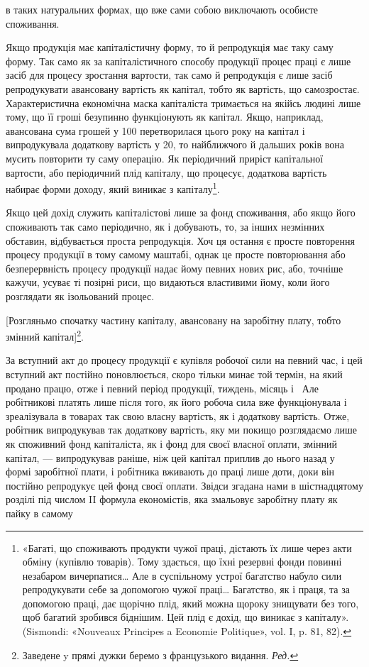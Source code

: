 \parcont{}  %
в таких натуральних формах, що вже сами собою виключають
особисте споживання.

Якщо продукція має капіталістичну форму, то й репродукція
має таку саму форму. Так само як за капіталістичного способу
продукції процес праці є лише засіб для процесу зростання
вартости, так само й репродукція є лише засіб репродукувати
авансовану вартість як капітал, тобто як вартість, що самозростає.
Характеристична економічна маска капіталіста тримається
на якійсь людині лише тому, що її гроші безупинно функціонують
як капітал. Якщо, наприклад, авансована сума грошей
у 100 перетворилася цього року на капітал
і випродукувала додаткову вартість у 20,
то найближчого й дальших років вона мусить повторити ту саму
операцію. Як періодичний приріст капітальної вартости, або
періодичний плід капіталу, що процесує, додаткова вартість набирає
форми доходу, який виникає з капіталу\footnote{
«Багаті, що споживають продукти чужої праці, дістають їх лише
через акти обміну (купівлю товарів). Тому здається, що їхні резервні
фонди повинні незабаром вичерпатися\dots{} Але в суспільному устрої багатство
набуло сили репродукувати себе за допомогою чужої праці\dots{} Багатство,
як і праця, та за допомогою праці, дає щорічно плід, який можна
щороку знищувати без того, щоб багатий зробився біднішим. Цей плід є
дохід, що виникає з капіталу». (Sismondi: «Nouveaux Principes a Economie
Politique», vol. I, p. 81, 82).
}.

Якщо цей дохід служить капіталістові лише за фонд споживання,
або якщо його споживають так само періодично, як і
добувають, то, за інших незмінних обставин, відбувається проста
репродукція. Хоч ця остання є просте повторення процесу продукції
в тому самому маштабі, однак це просте повторювання або
безперервність процесу продукції надає йому певних нових рис,
або, точніше кажучи, усуває ті позірні риси, що видаються властивими
йому, коли його розглядати як ізольований процес.

[Розгляньмо спочатку частину капіталу, авансовану на заробітну
плату, тобто змінний капітал]\footnote*{
Заведене y прямі дужки беремо з французького видання. \emph{Ред.}
}.

За вступний акт до процесу продукції є купівля робочої сили
на певний час, і цей вступний акт постійно поновлюється, скоро
тільки минає той термін, на який продано працю, отже і певний
період продукції, тиждень, місяць і~ Але робітникові платять
лише після того, як його робоча сила вже функціонувала і зреалізувала
в товарах так свою власну вартість, як і додаткову вартість.
Отже, робітник випродукував так додаткову вартість, яку
ми покищо розглядаємо лише як споживний фонд капіталіста,
як і фонд для своєї власної оплати, змінний капітал, — випродукував
раніше, ніж цей капітал приплив до нього назад у формі
заробітної плати, і робітника вживають до праці лише доти,
доки він постійно репродукує цей фонд своєї оплати. Звідси
згадана нами в шістнадцятому розділі під числом II формула
економістів, яка змальовує заробітну плату як пайку в самому
\parbreak{}  %

